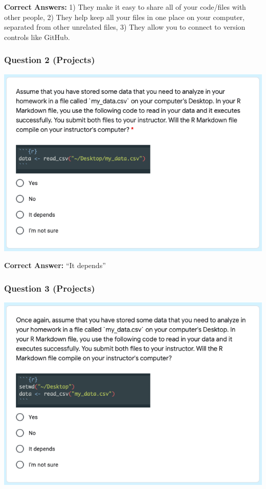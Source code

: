 \documentclass[12pt,twoside]{reedthesis}
\begin{document}
\textbf{Correct Answers:} 1) They make it easy to share all of your code/files with other people, 2) They help keep all your files in one place on your computer, separated from other unrelated files, 3) They allow you to connect to version controls like GitHub.

\hypertarget{question-2-projects}{%
\subsubsection{Question 2 (Projects)}\label{question-2-projects}}

\includegraphics[width=0.8\linewidth]{figure/appendix/test-2}

\textbf{Correct Answer:} ``It depends''

\hypertarget{question-3-projects}{%
\subsubsection{Question 3 (Projects)}\label{question-3-projects}}

\includegraphics[width=0.8\linewidth]{figure/appendix/test-3}
\end{document}
